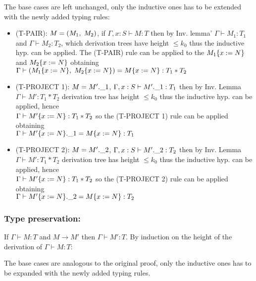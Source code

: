 The base cases are left unchanged, only the inductive ones has to be extended with the newly
added typing rules:
\begin{itemize}
	\item (T-PAIR): $M = (M_1,\;M_2)$, if $\Gamma, x: S \vdash M: T$ then by Inv. lemma'
	      $\Gamma \vdash M_1: T_1$ and $\Gamma \vdash M_2: T_2$, which derivation trees have
	      height $\le k_0$ thus the inductive hyp. can be applied. The (T-PAIR) rule can be
	      applied to the $M_1\{x:=N\}$ and $M_2\{x:=N\}$ obtaining\\
	      $\Gamma \vdash (M_1\{x:=N\},\;M_2\{x:=N\}) = M\{x:=N\} : T_1 * T_2$
	\item (T-PROJECT 1): $M = M'.\_1$, $\Gamma, x:S \vdash M'.\_1 : T_1$ then by
	      Inv. Lemma $\Gamma \vdash M' : T_1 \ast T_2$ derivation tree has height
	      $\le k_0$ thus the inductive hyp. can be applied, hence\\
	      $\Gamma \vdash M'\{x:=N\}: T_1 \ast T_2$ so the (T-PROJECT 1) rule can be applied
	      obtaining\\
	      $\Gamma \vdash M'\{x:=N\}.\_1 = M\{x:=N\}: T_1$
	\item (T-PROJECT 2): $M = M'.\_2$, $\Gamma, x:S \vdash M'.\_2 : T_2$ then by
	      Inv. Lemma $\Gamma \vdash M' : T_1 \ast T_2$ derivation tree has height
	      $\le k_0$ thus the inductive hyp. can be applied, hence\\
	      $\Gamma \vdash M'\{x:=N\}: T_1 \ast T_2$ so the (T-PROJECT 2) rule can be applied
	      obtaining\\
	      $\Gamma \vdash M'\{x:=N\}.\_2 = M\{x:=N\}: T_2$
\end{itemize}

\subsubsection*{Type preservation:}
If $\Gamma \vdash M: T$ and $M \to M'$ then $\Gamma \vdash M': T$. By induction on the height of
the derivation of $\Gamma \vdash M: T$:

The base cases are analogous to the original proof, only the inductive ones has to be expanded
with the newly added typing rules.

